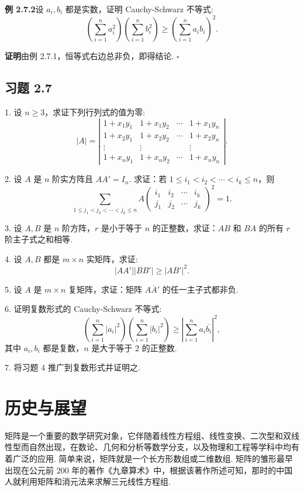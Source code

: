 \documentclass[UTF8, 12pt, fontset=fandol, oneside]{ctexart}
\begin{document}
\noindent\textbf{例 2.7.2}\quad 设 $a_i,b_i$ 都是实数，证明 Cauchy-Schwarz 不等式:
\[
\left(\sum_{i=1}^n a_i^2\right)\left(\sum_{i=1}^n b_i^2\right)\geq
\left(\sum_{i=1}^n a_ib_i\right)^2.
\]

\noindent\textbf{证明}\quad 由例 2.7.1，恒等式右边总非负，即得结论. $\square$

\subsection*{习题 2.7}

1. 设 $n\geq 3$，求证下列行列式的值为零:
\[
|A|=\left|\begin{array}{cccc}
1+x_1y_1 & 1+x_1y_2 & \cdots & 1+x_1y_n\\
1+x_2y_1 & 1+x_2y_2 & \cdots & 1+x_2y_n\\
\vdots & \vdots & & \vdots\\
1+x_ny_1 & 1+x_ny_2 & \cdots & 1+x_ny_n
\end{array}\right|.
\]

2. 设 $A$ 是 $n$ 阶实方阵且 $AA'=I_n$. 求证：若 $1\leq i_1<i_2<\cdots<i_k\leq n$，则
\[
\sum_{1\leq j_1<j_2<\cdots<j_k\leq n}
A\left(\begin{array}{cccc}
i_1 & i_2 & \cdots & i_k\\
j_1 & j_2 & \cdots & j_k
\end{array}\right)^2=1.
\]

3. 设 $A,B$ 是 $n$ 阶方阵，$r$ 是小于等于 $n$ 的正整数，求证：$AB$ 和 $BA$ 的所有 $r$ 阶主子式之和相等.

4. 设 $A,B$ 都是 $m\times n$ 实矩阵，求证:
\[
|AA'||BB'|\geq |AB'|^2.
\]

5. 设 $A$ 是 $m\times n$ 复矩阵，求证：矩阵 $A\overline{A}'$ 的任一主子式都非负.

6. 证明复数形式的 Cauchy-Schwarz 不等式:
\[
\left(\sum_{i=1}^n |a_i|^2\right)\left(\sum_{i=1}^n |b_i|^2\right)\geq
\left|\sum_{i=1}^n a_i\overline{b_i}\right|^2,
\]
其中 $a_i,b_i$ 都是复数，$n$ 是大于等于 2 的正整数.

7. 将习题 4 推广到复数形式并证明之.

\section*{历史与展望}

矩阵是一个重要的数学研究对象，它伴随着线性方程组、线性变换、二次型和双线性型而自然出现，在数论、几何和分析等数学分支，以及物理和工程等学科中均有着广泛的应用. 简单来说，矩阵就是一个长方形数组或二维数组. 矩阵的雏形最早出现在公元前 200 年的著作《九章算术》中，根据该著作所述可知，那时的中国人就利用矩阵和消元法来求解三元线性方程组.
\end{document}

